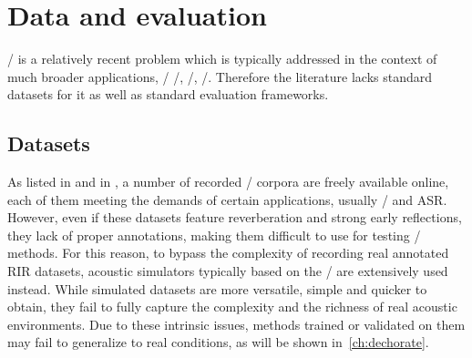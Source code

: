 \section{Data and evaluation}\label{sec:estimation:datametrics}
\AER/ is a relatively recent problem which is typically addressed in the context of much broader applications, \eg/ \SE/, \RooGE/, \SSL/.
Therefore the literature lacks standard datasets for it as well as standard evaluation frameworks.

\subsection{Datasets}\label{sec:estimation:datasets}
As listed in  and in , a number of recorded \RIR/ corpora are freely available online, each of them meeting the demands of certain applications, usually \SE/ and \ac{ASR}.
However, even if these datasets feature reverberation and strong early reflections, they lack of proper annotations, making them difficult to use for testing \AER/ methods.
For this reason, to bypass the complexity of recording real annotated RIR datasets, acoustic simulators typically based on the \ISM/ are extensively used instead.
While simulated datasets are more versatile, simple and quicker to obtain, they fail to fully capture the complexity and the richness of real acoustic environments.
Due to these intrinsic issues, methods trained or validated on them may fail to generalize to real conditions, as will be shown in~\cref{ch:dechorate}.

